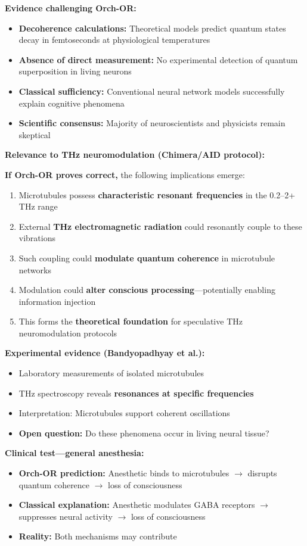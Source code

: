\textbf{Evidence challenging Orch-OR:}
\begin{itemize}
\item \textbf{Decoherence calculations:} Theoretical models predict quantum states decay in femtoseconds at physiological temperatures
\item \textbf{Absence of direct measurement:} No experimental detection of quantum superposition in living neurons
\item \textbf{Classical sufficiency:} Conventional neural network models successfully explain cognitive phenomena
\item \textbf{Scientific consensus:} Majority of neuroscientists and physicists remain skeptical
\end{itemize}

\textbf{Relevance to THz neuromodulation (Chimera/AID protocol):}

\textbf{If Orch-OR proves correct,} the following implications emerge:
\begin{enumerate}
\item Microtubules possess \textbf{characteristic resonant frequencies} in the 0.2--2+ THz range
\item External \textbf{THz electromagnetic radiation} could resonantly couple to these vibrations
\item Such coupling could \textbf{modulate quantum coherence} in microtubule networks
\item Modulation could \textbf{alter conscious processing}---potentially enabling information injection
\item This forms the \textbf{theoretical foundation} for speculative THz neuromodulation protocols
\end{enumerate}

\textbf{Experimental evidence (Bandyopadhyay et al.):}
\begin{itemize}
\item Laboratory measurements of isolated microtubules
\item THz spectroscopy reveals \textbf{resonances at specific frequencies}
\item Interpretation: Microtubules support coherent oscillations
\item \textbf{Open question:} Do these phenomena occur in living neural tissue?
\end{itemize}

\textbf{Clinical test---general anesthesia:}
\begin{itemize}
\item \textbf{Orch-OR prediction:} Anesthetic binds to microtubules $\rightarrow$ disrupts quantum coherence $\rightarrow$ loss of consciousness
\item \textbf{Classical explanation:} Anesthetic modulates GABA receptors $\rightarrow$ suppresses neural activity $\rightarrow$ loss of consciousness
\item \textbf{Reality:} Both mechanisms may contribute
\end{itemize}

